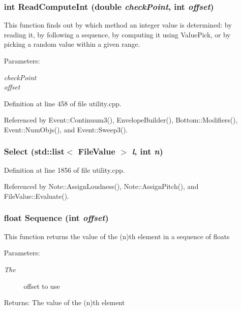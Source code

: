 \subsubsection{\setlength{\rightskip}{0pt plus 5cm}int Read\-Compute\-Int (double {\em check\-Point}, int {\em offset})}\label{utility_8cpp_a11}


This function finds out by which method an integer value is determined: by reading it, by following a sequence, by computing it using Value\-Pick, or by picking a random value within a given range. \begin{Desc}
\item[Parameters:]
\begin{description}
\item[{\em check\-Point}]\item[{\em offset}]\end{description}
\end{Desc}


Definition at line 458 of file utility.cpp.

Referenced by Event::Continuum3(), Envelope\-Builder(), Bottom::Modifiers(), Event::Num\-Objs(), and Event::Sweep3().
\subsubsection{ Select (std::list$<$ {\bf File\-Value} $>$ {\em l}, int {\em n})}\label{utility_8cpp_a35}




Definition at line 1856 of file utility.cpp.

Referenced by Note::Assign\-Loudness(), Note::Assign\-Pitch(), and File\-Value::Evaluate().
\subsubsection{\setlength{\rightskip}{0pt plus 5cm}float Sequence (int {\em offset})}\label{utility_8cpp_a19}


This function returns the value of the (n)th element in a sequence of floats \begin{Desc}
\item[Parameters:]
\begin{description}
\item[{\em The}]offset to use \end{description}
\end{Desc}
\begin{Desc}
\item[Returns:]The value of the (n)th element \end{Desc}



